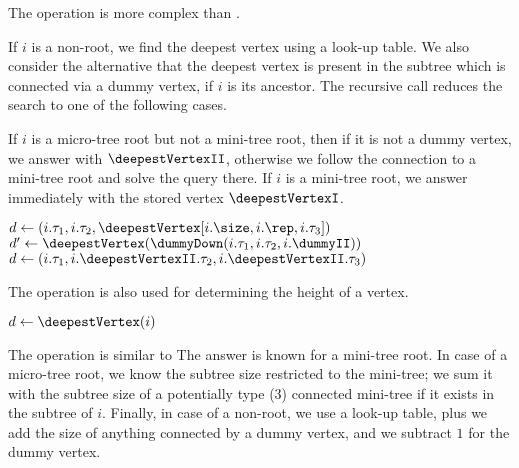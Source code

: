 The operation \deepestVertex{} is more complex than \dep{}.

If $i$ is a non-root, we find the deepest vertex using a look-up table.
We also consider the alternative that the deepest vertex is present in the subtree which is connected via a dummy vertex, if $i$ is its ancestor.
The recursive call reduces the search to one of the following cases.

If $i$ is a micro-tree root but not a mini-tree root, then if it is not a dummy vertex, we answer with $\deepestVertexII$, otherwise we follow the connection to a mini-tree root and solve the query there.
If $i$ is a mini-tree root, we answer immediately with the stored vertex $\deepestVertexI$.

\begin{algorithm}
\begin{algorithmic}
		\State $d \gets (i.\tau_1, i.\tau_2, \deepestVertex[i.\size, i.\rep, i.\tau_3])$ 
		 
			\State $d' \gets \deepestVertex(\dummyDown(i.\tau_1, i.\tau_2, i.\dummyII))$ 
				\State {}
			\Else
				\State {} 
			\EndIf
		\Else
			\State {}
		\EndIf
		\State $d \gets (i.\tau_1, i.\deepestVertexII.\tau_2, i.\deepestVertexII.\tau_3)$
		 
			\State {} 
		\Else
			\State {}
		\EndIf
	\Else
		\State {}
	\EndIf
\EndFunction
\end{algorithmic}
\end{algorithm}

The operation \deepestVertex{} is also used for determining the height of a vertex.

\begin{algorithm}
\begin{algorithmic}
	\State $d \gets \deepestVertex(i)$
	\State {}
\EndFunction
\end{algorithmic}
\end{algorithm}

The operation \subtreeSize{} is similar to \deepestVertex{}
The answer is known for a mini-tree root.
In case of a micro-tree root, we know the subtree size restricted to the mini-tree; we sum it with the subtree size of a potentially type (3) connected mini-tree if it exists in the subtree of $i$.
Finally, in case of a non-root, we use a look-up table, plus we add the size of anything connected by a dummy vertex, and we subtract $1$ for the dummy vertex.

